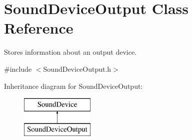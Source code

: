 \hypertarget{class_sound_device_output}{
\section{SoundDeviceOutput Class Reference}
\label{class_sound_device_output}
}


Stores information about an output device.  




{\ttfamily \#include $<$SoundDeviceOutput.h$>$}

Inheritance diagram for SoundDeviceOutput:\begin{figure}[H]
\begin{center}
\leavevmode
\includegraphics[height=2.000000cm]{class_sound_device_output}
\end{center}
\end{figure}
